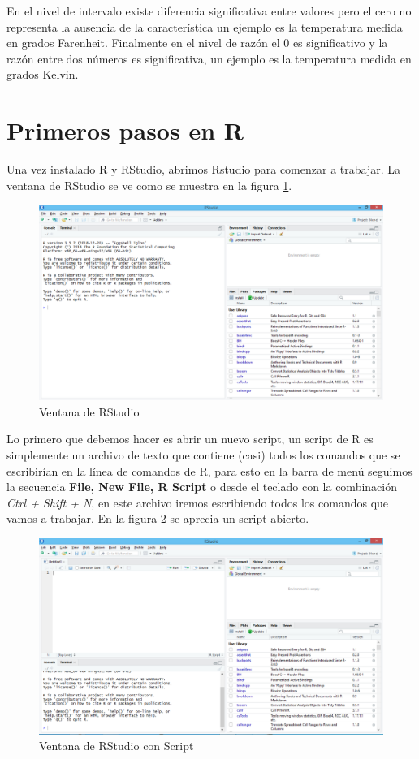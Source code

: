 \documentclass[]{book}
\begin{document}
En el nivel de intervalo existe diferencia significativa entre valores
pero el cero no representa la ausencia de la característica un ejemplo
es la temperatura medida en grados Farenheit. Finalmente en el nivel de
razón el 0 es significativo y la razón entre dos números es
significativa, un ejemplo es la temperatura medida en grados Kelvin.

\section{Primeros pasos en R}\label{primerR}

Una vez instalado R y RStudio, abrimos Rstudio para comenzar a trabajar.
La ventana de RStudio se ve como se muestra en la figura
\ref{fig:rstudio1}.

\begin{figure}[h]

{\centering \includegraphics[width=0.5\linewidth]{rstudio1} 

}

\caption{Ventana de RStudio}\label{fig:rstudio1}
\end{figure}

Lo primero que debemos hacer es abrir un nuevo script, un script de R es
simplemente un archivo de texto que contiene (casi) todos los comandos
que se escribirían en la línea de comandos de R, para esto en la barra
de menú seguimos la secuencia \textbf{File, New File, R Script} o desde
el teclado con la combinación \emph{Ctrl + Shift + N}, en este archivo
iremos escribiendo todos los comandos que vamos a trabajar. En la figura
\ref{fig:rstudio2} se aprecia un script abierto.

\begin{figure}[h]

{\centering \includegraphics[width=0.5\linewidth]{rstudio2} 

}

\caption{Ventana de RStudio con Script}\label{fig:rstudio2}
\end{figure}
\end{document}
